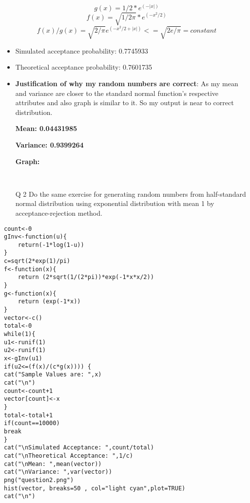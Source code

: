 \documentclass[11pt]{article}
\begin{document}
\begin{equation}
g(x)=1/2*e^{(-|x|)}
\end{equation}
\begin{equation}
f(x)=\sqrt{1/2\pi} *e^{(-x^2/2)}
\end{equation}
\begin{equation}
f(x)/g(x)=\sqrt{2/\pi}e^{(-x^2/2+|x|)}<=\sqrt{2e/\pi}=constant
\end{equation}
\begin{itemize}
	\item{Simulated acceptance probability: 0.7745933}
	\item{Theoretical acceptance probability: 0.7601735}
	\item{\textbf{Justification of why my random numbers are correct}: }
	As my mean and variance are closer to the standard normal function's respective attributes and also graph is similar to it. So my output is near to correct distribution. 

	\textbf{Mean: 0.04431985}\

	\textbf{Variance: 0.9399264}\

	\textbf{Graph: }\


\end{itemize}
  \begin{figure}[H]
  \centering
 \\
\end{figure}

\begin{enumerate}
\item[Q 2] Do the same exercise for generating random numbers from half-standard normal distribution using exponential distribution with mean 1 by acceptance-rejection method.
\end{enumerate}

\begin{lstlisting}
count<-0
gInv<-function(u){
	return(-1*log(1-u))
}
c=sqrt(2*exp(1)/pi)
f<-function(x){
	return (2*sqrt(1/(2*pi))*exp(-1*x*x/2))
}
g<-function(x){
	return (exp(-1*x))
}
vector<-c()
total<-0
while(1){
u1<-runif(1)
u2<-runif(1)
x<-gInv(u1)
if(u2<=(f(x)/(c*g(x)))) {
cat("Sample Values are: ",x)
cat("\n")
count<-count+1
vector[count]<-x
}
total<-total+1
if(count==10000)
break
}
cat("\nSimulated Acceptance: ",count/total)
cat("\nTheoretical Acceptance: ",1/c)
cat("\nMean: ",mean(vector))
cat("\nVariance: ",var(vector))
png("question2.png")
hist(vector, breaks=50 , col="light cyan",plot=TRUE)
cat("\n")
\end{lstlisting}
\end{document}
